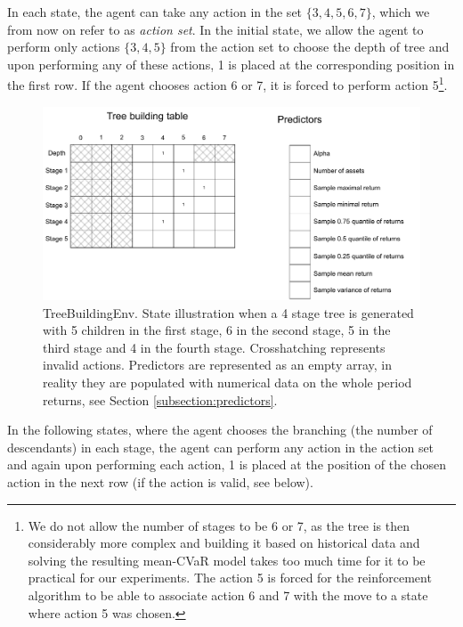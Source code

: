 In each state, the agent can take any action in the set $\{3,4,5,6,7\}$, which we from now on refer to as \textit{action set}. In the initial state, we allow the agent to perform only actions $\{3,4,5\}$ from the action set to choose the depth of tree and upon performing any of these actions, 1 is placed at the corresponding position in the first row. If the agent chooses action 6 or 7, it is forced to perform action 5\footnote{We do not allow the number of stages to be 6 or 7, as the tree is then considerably more complex and building it based on historical data and solving the resulting mean-CVaR model takes too much time for it to be practical for our experiments. The action 5 is forced for the reinforcement algorithm to be able to associate action 6 and 7 with the move to a state where action 5 was chosen.}.


\begin{figure}[H]
  \includegraphics[width=\linewidth]{../img/Treebuildingenv_graph.pdf}
  \caption{TreeBuildingEnv. State illustration when a 4 stage tree is generated with 5 children in the first stage, 6 in the second stage, 5 in the third stage and 4 in the fourth stage. Crosshatching represents invalid actions. Predictors are represented as an empty array, in reality they are populated with numerical data on the whole period returns, see Section \ref{subsection:predictors}.}
  \label{fig:treebuildingenv}
\end{figure}


In the following states, where the agent chooses the branching (the number of descendants) in each stage, the agent can perform any action in the action set and again upon performing each action, 1 is placed at the position of the chosen action in the next row (if the action is valid, see below). 

